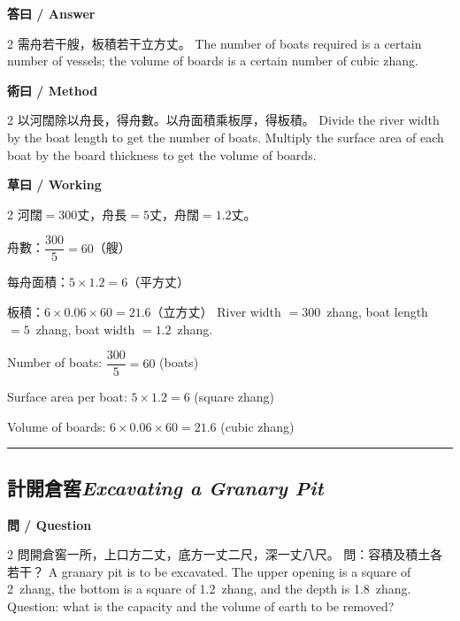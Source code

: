 \documentclass[11pt,a4paper]{article}
\newcommand{\bilingualsubsection}[2]{\subsection{#1\quad\textit{#2}}}
\newcommand{\longline}{\noindent\rule{\textwidth}{0.4pt}}
\begin{document}
\vspace{0.4em}
\noindent\textbf{\textcolor{chinesecolor}{答曰} / \textcolor{englishcolor}{Answer}}
\vspace{0.2em}
\begin{paracol}{2}
需舟若干艘，板積若干立方丈。
\switchcolumn
The number of boats required is a certain number of vessels; the volume
of boards is a certain number of cubic zhang.
\end{paracol}

\vspace{0.4em}
\noindent\textbf{\textcolor{chinesecolor}{術曰} / \textcolor{englishcolor}{Method}}
\vspace{0.2em}
\begin{paracol}{2}
以河闊除以舟長，得舟數。以舟面積乘板厚，得板積。
\switchcolumn
Divide the river width by the boat length to get the number of boats.
Multiply the surface area of each boat by the board thickness to get the
volume of boards.
\end{paracol}

\vspace{0.4em}
\noindent\textbf{\textcolor{chinesecolor}{草曰} / \textcolor{englishcolor}{Working}}
\vspace{0.2em}
\begin{paracol}{2}
河闊$=300$丈，舟長$=5$丈，舟闊$=1.2$丈。

舟數：$\dfrac{300}{5} = 60$（艘）

每舟面積：$5 \times 1.2 = 6$（平方丈）

板積：$6 \times 0.06 \times 60 = 21.6$（立方丈）
\switchcolumn
River width $= 300$~zhang, boat length $= 5$~zhang, boat width $= 1.2$~zhang.

Number of boats: $\dfrac{300}{5} = 60$ (boats)

Surface area per boat: $5 \times 1.2 = 6$ (square zhang)

Volume of boards: $6 \times 0.06 \times 60 = 21.6$ (cubic zhang)
\end{paracol}

\vspace{0.5em}
\longline

\bilingualsubsection{計開倉窖}{Excavating a Granary Pit}

\vspace{0.4em}
\noindent\textbf{\textcolor{chinesecolor}{問} / \textcolor{englishcolor}{Question}}
\vspace{0.3em}
\begin{paracol}{2}
問開倉窖一所，上口方二丈，底方一丈二尺，深一丈八尺。
問：容積及積土各若干？
\switchcolumn
A granary pit is to be excavated. The upper opening is a square of 2~zhang,
the bottom is a square of 1.2~zhang, and the depth is 1.8~zhang. Question:
what is the capacity and the volume of earth to be removed?
\end{paracol}
\end{document}
